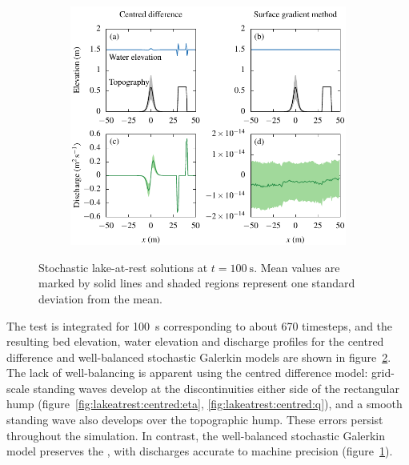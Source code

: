 \begin{figure}
\centering
\centering
\begin{subfigure}{\textwidth}
\label{fig:lakeatrest:centred:eta}
\label{fig:lakeatrest:sgm:eta}
\label{fig:lakeatrest:centred:q}
\label{fig:lakeatrest:sgm:q}
\centering
\includegraphics{fig-lakeatrest.pdf}
\end{subfigure}
\caption{Stochastic lake-at-rest solutions at $t = \SI{100}{\second}$.
Mean values are marked by solid lines and shaded regions represent one standard deviation from the mean.}
\label{fig:lakeatrest}
\end{figure}

The test is integrated for \SI{100}{\second} corresponding to about 670 timesteps, and the resulting bed elevation, water elevation and discharge profiles for the centred difference and well-balanced stochastic Galerkin models are shown in figure~\ref{fig:lakeatrest}.
The lack of well-balancing is apparent using the centred difference model: grid-scale standing waves develop at the discontinuities either side of the rectangular hump (figure~\ref{fig:lakeatrest:centred:eta}, \ref{fig:lakeatrest:centred:q}), and a smooth standing wave also develops over the topographic hump.
These errors persist throughout the simulation.
In contrast, the well-balanced stochastic Galerkin model preserves the \cproperty, with discharges accurate to machine precision (figure~\ref{fig:lakeatrest:sgm:q}).

